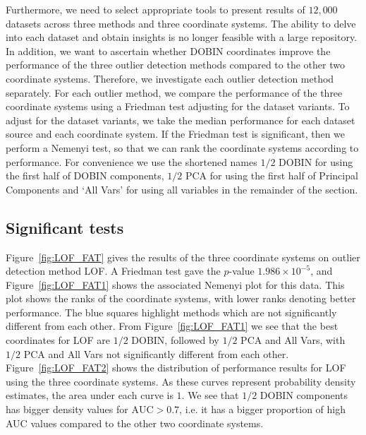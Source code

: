 \documentclass[11pt]{article}
\begin{document}
Furthermore, we need to select appropriate tools to present results of $12,000$ datasets across three methods and three coordinate systems. The ability to delve into each dataset and obtain  insights is no longer feasible with a large repository.  In addition, we want to ascertain whether DOBIN coordinates improve the performance of the three outlier detection methods compared to the other two coordinate systems. Therefore, we investigate each outlier detection method separately. For each outlier method, we compare the performance of the three coordinate systems using a Friedman test adjusting for the dataset variants. To adjust for the dataset variants, we take the median performance for each dataset source and each coordinate system.  If the Friedman test is significant, then we perform a Nemenyi test, so that we can rank the  coordinate systems according to performance. For convenience we use the shortened names $1/2$ DOBIN for using the first half of DOBIN components, $1/2$ PCA for using the first half of Principal Components and `All Vars' for using all variables in the remainder of the section.   

\subsection{Significant tests}\label{sec:DatRepo1}

Figure~\ref{fig:LOF_FAT} gives the results of the three coordinate systems on  outlier detection method LOF. A Friedman test gave the $p$-value $1.986 \times 10^{-5}$, and Figure~\ref{fig:LOF_FAT1} shows the associated Nemenyi plot for this data. This plot shows the ranks of the coordinate systems, with lower ranks denoting better performance. The blue squares highlight methods which are not significantly different from each other. From Figure~\ref{fig:LOF_FAT1} we see that the best coordinates for LOF are $1/2$ DOBIN, followed by $1/2$ PCA and All Vars, with $1/2$ PCA and  All Vars not significantly different from each other. 
Figure~\ref{fig:LOF_FAT2} shows the distribution of performance results for LOF using the three coordinate systems. As these curves represent probability density estimates, the area under each curve is $1$. We see that $1/2$ DOBIN components has bigger density values for $\text{AUC} > 0.7$, i.e. it has a bigger proportion of high AUC values compared to the other two coordinate systems. \\   
\end{document}
